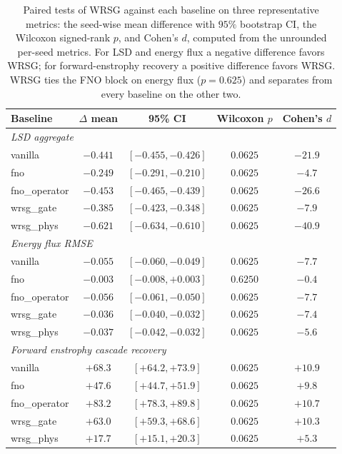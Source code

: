 \documentclass[10pt]{article} %
\begin{document}
\begin{table}[H]
\centering
\caption{Paired tests of WRSG against each baseline on three representative metrics: the seed-wise mean difference with $95\%$ bootstrap CI, the Wilcoxon signed-rank $p$, and Cohen's $d$, computed from the unrounded per-seed metrics. For LSD and energy flux a negative difference favors WRSG; for forward-enstrophy recovery a positive difference favors WRSG. WRSG ties the FNO block on energy flux ($p=0.625$) and separates from every baseline on the other two.}
\label{tab:tests}
\begin{tabular}{lcccc}
\toprule
Baseline & $\Delta$ mean & 95\% CI & Wilcoxon $p$ & Cohen's $d$ \\
\midrule
\multicolumn{5}{l}{\emph{LSD aggregate}} \\
vanilla        & $-0.441$ & $[-0.455, -0.426]$ & $0.0625$ & $-21.9$ \\
fno            & $-0.249$ & $[-0.291, -0.210]$ & $0.0625$ & $-4.7$  \\
fno\_operator  & $-0.453$ & $[-0.465, -0.439]$ & $0.0625$ & $-26.6$ \\
wrsg\_gate     & $-0.385$ & $[-0.423, -0.348]$ & $0.0625$ & $-7.9$  \\
wrsg\_phys     & $-0.621$ & $[-0.634, -0.610]$ & $0.0625$ & $-40.9$ \\
\midrule
\multicolumn{5}{l}{\emph{Energy flux RMSE}} \\
vanilla        & $-0.055$ & $[-0.060, -0.049]$ & $0.0625$ & $-7.7$ \\
fno            & $-0.003$ & $[-0.008, +0.003]$ & $0.6250$ & $-0.4$ \\
fno\_operator  & $-0.056$ & $[-0.061, -0.050]$ & $0.0625$ & $-7.7$ \\
wrsg\_gate     & $-0.036$ & $[-0.040, -0.032]$ & $0.0625$ & $-7.4$ \\
wrsg\_phys     & $-0.037$ & $[-0.042, -0.032]$ & $0.0625$ & $-5.6$ \\
\midrule
\multicolumn{5}{l}{\emph{Forward enstrophy cascade recovery}} \\
vanilla        & $+68.3$ & $[+64.2, +73.9]$ & $0.0625$ & $+10.9$ \\
fno            & $+47.6$ & $[+44.7, +51.9]$ & $0.0625$ & $+9.8$  \\
fno\_operator  & $+83.2$ & $[+78.3, +89.8]$ & $0.0625$ & $+10.7$ \\
wrsg\_gate     & $+63.0$ & $[+59.3, +68.6]$ & $0.0625$ & $+10.3$ \\
wrsg\_phys     & $+17.7$ & $[+15.1, +20.3]$ & $0.0625$ & $+5.3$  \\
\bottomrule
\end{tabular}
\end{table}
\end{document}
